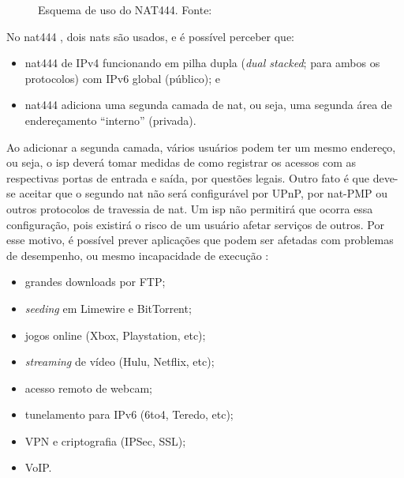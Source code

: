 \begin{figure}[H]
    \centering
    \caption{Esquema de uso do NAT444. Fonte:\cite{site:nat444}}
    \label{fig:nat444}
\end{figure}

No \gls*{nat}444 \cite{site:nat444}, dois \glspl*{nat} são usados, e é possível perceber que:

\begin{itemize}
    \item \gls*{nat}444 de IPv4 funcionando em pilha dupla (\emph{dual stacked}; para
        ambos os protocolos) com IPv6 global (público); e

    \item \gls*{nat}444 adiciona uma segunda camada de \gls*{nat}, ou seja, uma segunda
        área de endereçamento ``interno'' (privada).
\end{itemize}

Ao adicionar a segunda camada, vários usuários podem ter um mesmo endereço, ou seja, o
\gls*{isp} deverá tomar medidas de como registrar os acessos com as respectivas portas
de entrada e saída, por questões legais. Outro fato é que deve-se aceitar que o segundo
\gls*{nat} não será configurável por UPnP, por \gls*{nat}-PMP ou outros protocolos de
travessia de \gls*{nat}. Um \gls*{isp} não permitirá que ocorra essa configuração, pois
existirá o risco de um usuário afetar serviços de outros. Por esse motivo, é possível
prever aplicações que podem ser afetadas com problemas de desempenho, ou mesmo
incapacidade de execução \cite{site:rfcnat444}:

\begin{itemize}
    \item grandes downloads por FTP;
    \item \emph{seeding} em Limewire e BitTorrent;
    \item jogos online (Xbox, Playstation, etc);
    \item \emph{streaming} de vídeo (Hulu, Netflix, etc);
    \item acesso remoto de webcam;
    \item tunelamento para IPv6 (6to4, Teredo, etc);
    \item VPN e criptografia (IPSec, SSL);
    \item VoIP.
\end{itemize}